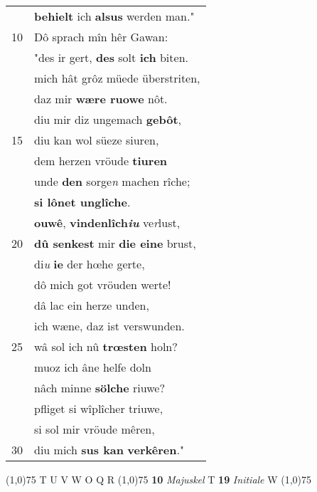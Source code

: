 \documentclass[8pt,a4paper,notitlepage]{article}
\begin{document}
\begin{table}[ht]
\begin{minipage}[t]{0.5\linewidth}
\begin{tabular}{rl}
 & \textbf{behielt} ich \textbf{alsus} werden man."\\ 
10 & Dô sprach mîn hêr Gawan:\\ 
 & "des ir gert, \textbf{des} solt \textbf{ich} biten.\\ 
 & mich hât grôz müede überstriten,\\ 
 & daz mir \textbf{wære ruowe} nôt.\\ 
 & diu mir diz ungemach \textbf{gebôt},\\ 
15 & diu kan wol süeze siuren,\\ 
 & dem herzen vröude \textbf{tiuren}\\ 
 & unde \textbf{den} sorge\textit{n} machen rîche;\\ 
 & \textbf{si lônet unglîche}.\\ 
 & \textbf{ouwê}, \textbf{vindenlîch\textit{iu}} ve\textit{r}lust,\\ 
20 & \textbf{dû senkest} mir \textbf{die eine} brust,\\ 
 & di\textit{u} \textbf{ie} der hœhe gerte,\\ 
 & dô mich got vröuden werte!\\ 
 & dâ lac ein herze unden,\\ 
 & ich wæne, daz ist verswunden.\\ 
25 & wâ sol ich nû \textbf{trœsten} holn?\\ 
 & muoz ich âne helfe doln\\ 
 & nâch minne \textbf{sölche} riuwe?\\ 
 & pfliget si wîplîcher triuwe,\\ 
 & si sol mir vröude mêren,\\ 
30 & diu mich \textbf{sus kan} \textbf{verkêren}."\\ 
\end{tabular}
\scriptsize
\line(1,0){75} \newline
T U V W O Q R \newline
\line(1,0){75} \newline
\textbf{10} \textit{Majuskel} T  \textbf{19} \textit{Initiale} W  \newline
\line(1,0){75} \newline

\end{minipage}
\end{table}
\end{document}
